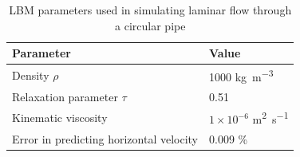 \begin{table}
\caption{LBM parameters used in simulating laminar flow through 
a circular pipe}
\label{table:lbm}
\centering
\begin{tabular}{ll}
\toprule
\textbf{Parameter} & \textbf{Value} \\ \midrule
Density $\rho$ & 1000 \si{\kilogram\per\metre\cubed}\\ 
Relaxation parameter $\tau$ & 0.51 \\ 
Kinematic viscosity  & $1 \times 10^{-6}$ \si{\metre\squared\per\second} \\ 
\midrule
Error in predicting horizontal velocity & 0.009 \% \\ \bottomrule
\end{tabular}
\end{table}

